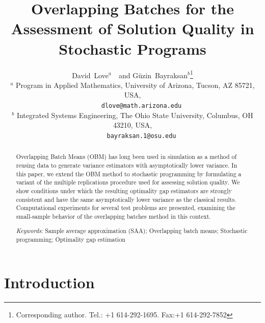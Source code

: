 \documentclass[12pt]{article}
\newcommand{\Keywords}[1]{\par\noindent 
{\small{\em Keywords\/}: #1}}
\begin{document}
\title{Overlapping Batches for the Assessment of Solution Quality in Stochastic Programs}

\author{David~Love$^{a}$\ \ and G\"{u}zin~Bayraksan$^{b}$\thanks{Corresponding author. Tel.: +1 614-292-1695. Fax:+1 614-292-7852}\\[6pt]
{\small
      $^{a}$ Program in Applied Mathematics, University of Arizona, Tucson, AZ 85721, USA,}\\
{\small \ \ \ \ \ \texttt{dlove@math.arizona.edu}} \\
{\small 
      $^{b}$ Integrated Systems Engineering, The Ohio State University, Columbus, OH 43210, USA,}\\
{\small \ \ \ \  \   \texttt{bayraksan.1@osu.edu}}}
\date{}

\maketitle

\begin{abstract}
\noindent Overlapping Batch Means (OBM) has long been used in simulation as a method of reusing data to generate variance estimators with asymptotically lower variance.
In this paper, we extend the OBM method to stochastic programming by formulating a variant of the multiple replications procedure used for assessing solution quality.
We show conditions under which the resulting optimality gap estimators are strongly consistent and have the same asymptotically lower variance as the classical results.
Computational experiments for several test problems are presented, examining the small-sample behavior of the overlapping batches method in this context.\medskip

\Keywords{Sample average approximation (SAA); Overlapping batch means;   Stochastic programming; Optimality gap estimation}
\end{abstract}

\section{Introduction}
\label{sec:intro}
\end{document}
